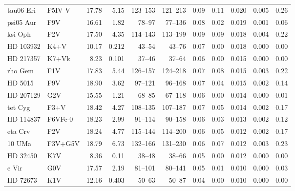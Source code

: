 \documentclass[11pt,a4paper]{article}
\begin{document}
{\begin{longtable}{llrrrrrrrrr}
tau06 Eri & F5IV-V & 17.78 & 5.15 & 123--153 & 121--213 & 0.09 & 0.11 & 0.020 & 0.005 & 0.26 \\
psi05 Aur & F9V & 16.61 & 1.82 & 78--97 & 77--136 & 0.08 & 0.02 & 0.019 & 0.001 & 0.06 \\
ksi Oph & F2V & 17.50 & 4.35 & 114--143 & 113--199 & 0.09 & 0.09 & 0.018 & 0.004 & 0.22 \\
HD 103932 & K4+V & 10.17 & 0.212 & 43--54 & 43--76 & 0.07 & 0.00 & 0.018 & 0.000 & 0.00 \\
HD 217357 & K7+Vk & 8.23 & 0.101 & 37--46 & 37--64 & 0.06 & 0.00 & 0.015 & 0.000 & 0.00 \\
rho Gem & F1V & 17.83 & 5.44 & 126--157 & 124--218 & 0.07 & 0.08 & 0.015 & 0.003 & 0.22 \\
HD   5015 & F9V & 18.90 & 3.62 & 97--121 & 96--168 & 0.07 & 0.04 & 0.015 & 0.002 & 0.14 \\
HD 207129 & G2V & 15.55 & 1.21 & 68--85 & 67--118 & 0.06 & 0.00 & 0.014 & 0.000 & 0.01 \\
tet Cyg & F3+V & 18.42 & 4.27 & 108--135 & 107--187 & 0.07 & 0.05 & 0.014 & 0.002 & 0.17 \\
HD 114837 & F6VFe-0 & 18.23 & 2.99 & 91--114 & 90--158 & 0.06 & 0.03 & 0.013 & 0.002 & 0.12 \\
eta Crv & F2V & 18.24 & 4.77 & 115--144 & 114--200 & 0.06 & 0.05 & 0.012 & 0.002 & 0.17 \\
10 UMa & F3V+G5V & 18.79 & 6.73 & 132--166 & 131--230 & 0.06 & 0.07 & 0.012 & 0.003 & 0.23 \\
HD  32450 & K7V & 8.36 & 0.11 & 38--48 & 38--66 & 0.05 & 0.00 & 0.012 & 0.000 & 0.00 \\
e Vir & G0V & 17.57 & 2.19 & 81--101 & 80--141 & 0.05 & 0.01 & 0.010 & 0.000 & 0.03 \\
HD  72673 & K1V & 12.16 & 0.403 & 50--63 & 50--87 & 0.04 & 0.00 & 0.010 & 0.000 & 0.00 \\
\bottomrule
\end{longtable}
}
\end{document}
